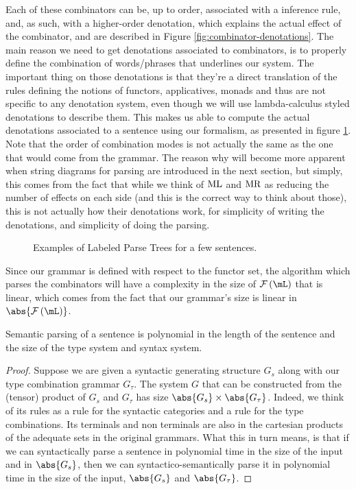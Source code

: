 Each of these combinators can be, up to order, associated with a inference
rule, and, as such, with a higher-order denotation, which explains the actual
effect of the combinator, and are described in Figure
\ref{fig:combinator-denotations}.
The main reason we need to get denotations associated to combinators, is to
properly define the combination of words/phrases that underlines our system.
The important thing on those denotations is that they're a direct translation
of the rules defining the notions of functors, applicatives, monads and thus
are not specific to any denotation system, even though we will use
lambda-calculus styled denotations to describe them.
This makes us able to compute the actual denotations associated to a sentence
using our formalism, as presented in figure \ref{fig:parsing-trees}.
Note that the order of combination modes is not actually the same as the one
that would come from the grammar.
The reason why will become more apparent when string diagrams for parsing are
introduced in the next section, but simply, this comes from the fact that while
we think of $\text{ML}$ and $\text{MR}$ as reducing the number of effects on each
side (and this is the correct way to think about those), this is not actually
how their denotations work, for simplicity of writing the denotations, and
simplicity of doing the parsing.

\begin{figure}
	\centering
	
	\caption{Examples of Labeled Parse Trees for a few sentences.}
	\label{fig:parsing-trees}
\end{figure}

\medskip

Since our grammar is defined with respect to the functor set, the algorithm
which parses the combinators will have a complexity in the size of
$\mFunc\left(\mL\right)$ that is linear, which comes from the fact that our
grammar's size is linear in $\abs{\mFunc\left(\mL\right)}$.

\begin{thm}
	\label{thm:ptime-parse}
	Semantic parsing of a sentence is polynomial in the length of the	sentence
	and the size of the type system and syntax system.
\end{thm}
\begin{proof}
	Suppose we are given a syntactic generating structure $G_{s}$ along with our
	type combination grammar $G_{\tau}$.
	The system $G$ that can be constructed from the (tensor) product of $G_{s}$ and
	$G_{\tau}$ has size $\abs{G_{s}}\times \abs{G_{\tau}}$.
	Indeed, we think of its rules as a rule for the syntactic categories and a rule
	for the type combinations. Its terminals and non terminals are also in the
	cartesian products of the adequate sets in the original grammars.
	What this in turn means, is that if we can syntactically parse a sentence in
	polynomial time in the size of the input and in $\abs{G_{s}}$, then we can
	syntactico-semantically parse it in polynomial time in the size of the input,
	$\abs{G_{s}}$ and $\abs{G_{\tau}}$.
\end{proof}

